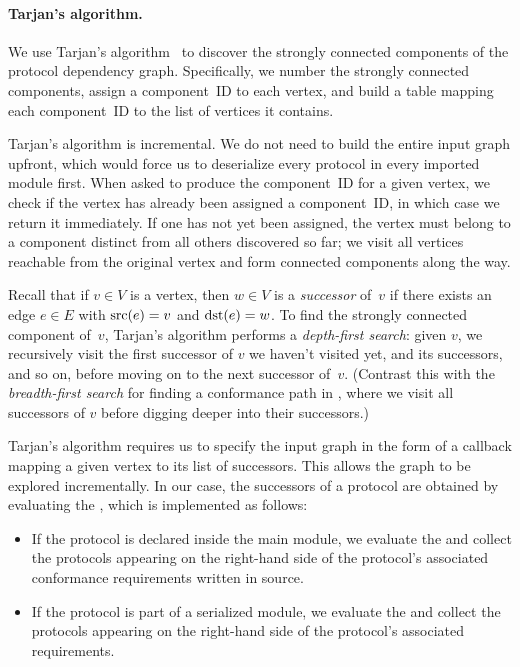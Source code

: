\documentclass[../generics]{subfiles}
\begin{document}
\paragraph{Tarjan's algorithm.} We use Tarjan's algorithm~\cite{tarjan} to discover the strongly connected components of the protocol dependency graph. Specifically, we number the strongly connected components, assign a component~ID to each vertex, and build a table mapping each component~ID to the list of vertices it contains.

Tarjan's algorithm is incremental. We do not need to build the entire input graph upfront, which would force us to deserialize every protocol in every imported module first. When asked to produce the component~ID for a given vertex, we check if the vertex has already been assigned a component~ID, in which case we return it immediately. If one has not yet been assigned, the vertex must belong to a component distinct from all others discovered so far; we visit all vertices reachable from the original vertex and form connected components along the way.

Recall that if $v\in V$ is a vertex, then $w\in V$ is a \emph{successor} of~$v$ if there exists an edge $e\in E$ with $\operatorname{src}(e)=v$ and $\operatorname{dst}(e)=w$. To find the strongly connected component of~$v$, Tarjan's algorithm performs a \emph{depth-first search}: given $v$, we recursively visit the first successor of $v$ we haven't visited yet, and its successors, and so on, before moving on to the next successor of~$v$. (Contrast this with the \emph{breadth-first search} for finding a conformance path in , where we visit all successors of $v$ before digging deeper into their successors.)

Tarjan's algorithm requires us to specify the input graph in the form of a callback mapping a given vertex to its list of successors. This allows the graph to be explored incrementally. In our case, the successors of a protocol are obtained by evaluating the , which is implemented as follows:
\begin{itemize}
\item If the protocol is declared inside the main module, we evaluate the  and collect the protocols appearing on the right-hand side of the protocol's associated conformance requirements written in source.

\item If the protocol is part of a serialized module, we evaluate the  and collect the protocols appearing on the right-hand side of the protocol's associated requirements.
\end{itemize}
\end{document}

